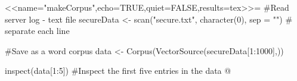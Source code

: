 \begin{frame}
<<name="makeCorpus",echo=TRUE,quiet=FALSE,results=tex>>=
#Read server log - text file
secureData <- scan("secure.txt", character(0), sep = "\n") # separate each line

#Save as a word corpus
data <- Corpus(VectorSource(secureData[1:1000],))

inspect(data[1:5]) #Inspect the first five entries in the data
@ 
\end{frame}

